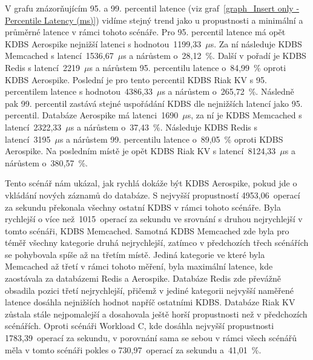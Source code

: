 \documentclass[czech,master,dept460,male,csharp,cpdeclaration]{diploma}
\begin{document}
	V grafu znázorňujícím 95. a 99. percentil latence (viz graf~\ref{graph_Insert only - Percentile Latency (ms)}) vidíme stejný trend jako u propustnosti a minimální a průměrné latence v rámci tohoto scénáře. Pro 95. percentil latence má opět KDBS Aerospike nejnižší latenci s hodnotou~1199,33~$\mu$s. Za ní následuje KDBS Memcached s latencí~1536,67~$\mu$s a nárůstem o~28,12~\%. Další v pořadí je KDBS Redis s latencí~2219~$\mu$s a nárůstem 95. percentilu latence o~84,99~\% oproti KDBS Aerospike. Poslední je pro tento percentil KDBS Riak KV s 95. percentilem latence s hodnotou~4386,33~$\mu$s a nárůstem o~265,72~\%. Následně pak 99. percentil zastává stejné uspořádání KDBS dle nejnižších latencí jako 95. percentil. Databáze Aerospike má latenci~1690~$\mu$s, za ní je KDBS Memcached s latencí~2322,33~$\mu$s a nárůstem o~37,43~\%. Následuje KDBS Redis s latencí~3195~$\mu$s a nárůstem 99. percentilu latence o~89,05~\% oproti KDBS Aerospike. Na posledním místě je opět KDBS Riak KV s latencí~8124,33~$\mu$s a nárůstem o~380,57~\%.
	
	Tento scénář nám ukázal, jak rychlá dokáže být KDBS Aerospike, pokud jde o vkládání nových záznamů do databáze. S nejvyšší propustností 4953,06~operací za sekundu překonala všechny ostatní KDBS v rámci tohoto scénáře. Byla rychlejší o více než~1015~operací za sekundu ve srovnání s druhou nejrychlejší v tomto scénáři, KDBS Memcached. Samotná KDBS Memcached zde byla pro téměř všechny kategorie druhá nejrychlejší, zatímco v předchozích třech scénářích se pohybovala spíše až na třetím místě. Jediná kategorie ve které byla Memcached až třetí v rámci tohoto měření, byla maximální latence, kde zaostávala za databázemi Redis a Aerospike. Databáze Redis zde převážně obsadila pozici třetí nejrychlejší, přičemž v jediné kategorii nejvyšší naměřené latence dosáhla nejnižších hodnot napříč ostatními KDBS. Databáze Riak KV zůstala stále nejpomalejší a dosahovala ještě horší propustnosti než v předchozích scénářích. Oproti scénáři Workload C, kde dosáhla nejvyšší propustnosti 1783,39~operací za sekundu, v porovnání sama se sebou v rámci všech scénářů měla v tomto scénáři pokles o 730,97~operací za sekundu a~41,01~\%.
	
\end{document}
